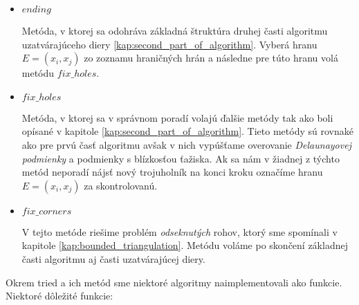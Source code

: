 \begin{itemize}
{\begin{itemize}
{                Metóda ekvivalentná s krokom číslo $9$ v kapitole \ref{kap:finding_new_vertex},
                pokúšajúca sa vytvoriť trojuholníky so susednými vyrcholmi $x_{prev}$ a $x_{next}$.
            }
            \item{
                $ending$

                Metóda, v ktorej sa odohráva základná štruktúra druhej časti algoritmu uzatvárajúceho
                diery \ref{kap:second_part_of_algorithm}. Vyberá hranu $E=(x_i, x_j)$ zo zoznamu hraničných 
                hrán a následne pre túto hranu volá metódu $fix\_holes$.
            }
            \item{
                $fix\_holes$

                Metóda, v ktorej sa v správnom poradí volajú ďalšie metódy tak ako boli opísané v 
                kapitole \ref{kap:second_part_of_algorithm}. Tieto metódy sú rovnaké ako pre prvú
                časť algoritmu avšak v nich vypúšťame overovanie \textit{Delaunayovej podmienky} a
                podmienky s blízkosťou ťažiska.
                Ak sa nám v žiadnej z týchto metód neporadí nájsť nový trojuholník na konci kroku 
                označíme hranu $E = (x_i, x_j)$ za skontrolovanú.
            }
            \item{
                $fix\_corners$

                V tejto metóde riešime problém \textit{odseknutých} rohov, ktorý sme spomínali v
                kapitole \ref{kap:bounded_triangulation}.
                Metódu voláme po skončení základnej časti algoritmu aj časti uzatvárajúcej diery.
            }
        \end{itemize}
        }

\end{itemize}
Okrem tried a ich metód sme niektoré algoritmy naimplementovali ako funkcie. 
        Niektoré dôležité funkcie:
